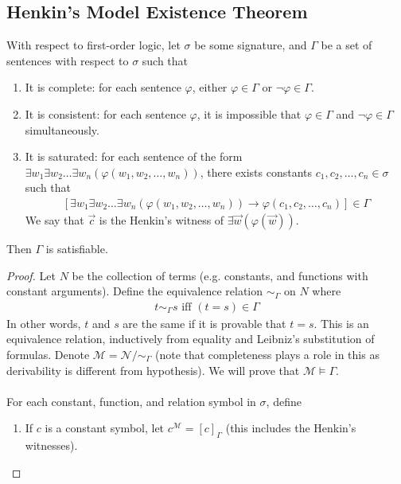 \documentclass{treatise}
\begin{document}
\begin{shaded}
\subsection{Henkin's Model Existence Theorem}
\begin{theorem}
With respect to first-order logic, let $\sigma$ be some signature, and $\Gamma$ be a set of sentences with respect to $\sigma$ such that
\begin{enumerate}
    \item It is complete: for each sentence $\varphi$, either $\varphi \in \Gamma$ or $\neg \varphi \in \Gamma$.
    \item It is consistent: for each sentence $\varphi$, it is impossible that $\varphi \in \Gamma$ and $\neg \varphi \in \Gamma$ simultaneously.
    \item It is saturated: for each sentence of the form $\exists w_1 \exists w_2 \hdots \exists w_n (\varphi(w_1, w_2, \hdots, w_n))$, there exists constants $c_1, c_2, \hdots, c_n \in \sigma$ such that
    \begin{align*}
        \left[ \exists w_1 \exists w_2 \hdots \exists w_n (\varphi(w_1, w_2, \hdots, w_n)) \to \varphi(c_1, c_2, \hdots, c_n) \right] \in \Gamma
    \end{align*}
    We say that $\vec{c}$ is the Henkin's witness of $\exists \vec{w} (\varphi(\vec{w}))$.
\end{enumerate}
Then $\Gamma$ is satisfiable.
\end{theorem}
\begin{proof}
Let $N$ be the collection of terms (e.g. constants, and functions with constant arguments). Define the equivalence relation $\sim_\Gamma$ on $N$ where
\begin{align*}
    t \sim_\Gamma s \mbox{ iff } (t = s) \in \Gamma
\end{align*}
In other words, $t$ and $s$ are the same if it is provable that $t = s$. This is an equivalence relation, inductively from equality and Leibniz's substitution of formulas. Denote $\mathcal{M} = \mathcal{N}/\sim_\Gamma$ (note that completeness plays a role in this as derivability is different from hypothesis). We will prove that $\mathcal{M} \vDash \Gamma$.
\\
\\
For each constant, function, and relation symbol in $\sigma$, define
\begin{enumerate}
    \item If $c$ is a constant symbol, let $c^\mathcal{M} = [c]_\Gamma$ (this includes the Henkin's witnesses).

\end{enumerate}
\end{proof}
\end{shaded}
\end{document}
